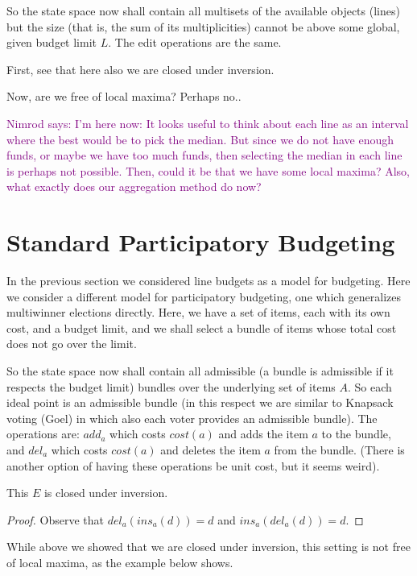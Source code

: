 \documentclass{llncs}
\newcommand{\nimrod}[1]{\textcolor{purple}{Nimrod says: #1}}
\begin{document}
So the state space now shall contain all multisets of the available objects (lines) but the size (that is, the sum of its multiplicities) cannot be above some global, given budget limit $L$. The edit operations are the same. 

First, see that here also we are closed under inversion.

Now, are we free of local maxima? Perhaps no..

\nimrod{I'm here now:
  It looks useful to think about each line as an interval where the best would be to pick the median. But since we do not have enough funds, or maybe we have too much funds, then selecting the median in each line is perhaps not possible. Then, could it be that we have some local maxima? Also, what exactly does our aggregation method do now?}


\section{Standard Participatory Budgeting}

In the previous section we considered line budgets as a model for budgeting.
Here we consider a different model for participatory budgeting, one which generalizes multiwinner elections directly. Here, we have a set of items, each with its own cost, and a budget limit, and we shall select a bundle of items whose total cost does not go over the limit.

So the state space now shall contain all admissible (a bundle is admissible if it respects the budget limit) bundles over the underlying set of items $A$. So each ideal point is an admissible bundle (in this respect we are similar to Knapsack voting (Goel) in which also each voter provides an admissible bundle).
The operations are: $add_a$ which costs $cost(a)$ and adds the item $a$ to the bundle, and $del_a$ which costs $cost(a)$ and deletes the item $a$ from the bundle. (There is another option of having these operations be unit cost, but it seems weird).

\begin{lemma}
  This $E$ is closed under inversion.
\end{lemma}

\begin{proof}
  Observe that $del_a(ins_a(d)) = d$ and $ins_a(del_a(d)) = d$.
\end{proof}

While above we showed that we are closed under inversion,
this setting is not free of local maxima, as the example below shows.
\end{document}
